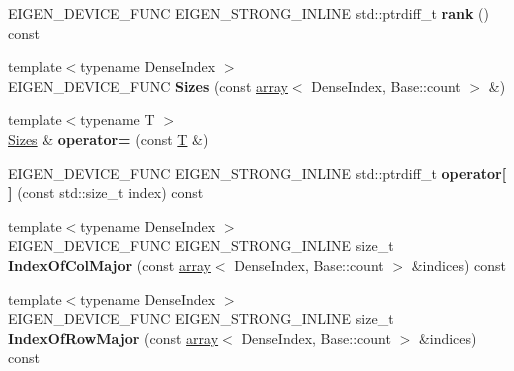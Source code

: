 \begin{DoxyCompactItemize}
\item 
\mbox{\label{struct_eigen_1_1_sizes_ab7bfcdb30ee78574d8f403d52cecdd45}} 
E\+I\+G\+E\+N\+\_\+\+D\+E\+V\+I\+C\+E\+\_\+\+F\+U\+NC E\+I\+G\+E\+N\+\_\+\+S\+T\+R\+O\+N\+G\+\_\+\+I\+N\+L\+I\+NE std\+::ptrdiff\+\_\+t {\bfseries rank} () const
\item 
\mbox{\label{struct_eigen_1_1_sizes_afda455d971c56ffb3913330ac7187dda}} 
{\footnotesize template$<$typename Dense\+Index $>$ }\\E\+I\+G\+E\+N\+\_\+\+D\+E\+V\+I\+C\+E\+\_\+\+F\+U\+NC {\bfseries Sizes} (const \hyperlink{class_eigen_1_1array}{array}$<$ Dense\+Index, Base\+::count $>$ \&)
\item 
\mbox{\label{struct_eigen_1_1_sizes_adf2b582376e79409835b5c3249122a7b}} 
{\footnotesize template$<$typename T $>$ }\\\hyperlink{struct_eigen_1_1_sizes}{Sizes} \& {\bfseries operator=} (const \hyperlink{group___sparse_core___module}{T} \&)
\item 
\mbox{\label{struct_eigen_1_1_sizes_abfbcc60edc2c56c86c0d2eae43f98b25}} 
E\+I\+G\+E\+N\+\_\+\+D\+E\+V\+I\+C\+E\+\_\+\+F\+U\+NC E\+I\+G\+E\+N\+\_\+\+S\+T\+R\+O\+N\+G\+\_\+\+I\+N\+L\+I\+NE std\+::ptrdiff\+\_\+t {\bfseries operator\mbox{[}$\,$\mbox{]}} (const std\+::size\+\_\+t index) const
\item 
\mbox{\label{struct_eigen_1_1_sizes_a12861d5ff0ba87f40598dda26a5b7ce0}} 
{\footnotesize template$<$typename Dense\+Index $>$ }\\E\+I\+G\+E\+N\+\_\+\+D\+E\+V\+I\+C\+E\+\_\+\+F\+U\+NC E\+I\+G\+E\+N\+\_\+\+S\+T\+R\+O\+N\+G\+\_\+\+I\+N\+L\+I\+NE size\+\_\+t {\bfseries Index\+Of\+Col\+Major} (const \hyperlink{class_eigen_1_1array}{array}$<$ Dense\+Index, Base\+::count $>$ \&indices) const
\item 
\mbox{\label{struct_eigen_1_1_sizes_ac4140adc06d53f5cf8f5f171784b3ded}} 
{\footnotesize template$<$typename Dense\+Index $>$ }\\E\+I\+G\+E\+N\+\_\+\+D\+E\+V\+I\+C\+E\+\_\+\+F\+U\+NC E\+I\+G\+E\+N\+\_\+\+S\+T\+R\+O\+N\+G\+\_\+\+I\+N\+L\+I\+NE size\+\_\+t {\bfseries Index\+Of\+Row\+Major} (const \hyperlink{class_eigen_1_1array}{array}$<$ Dense\+Index, Base\+::count $>$ \&indices) const
\end{DoxyCompactItemize}
